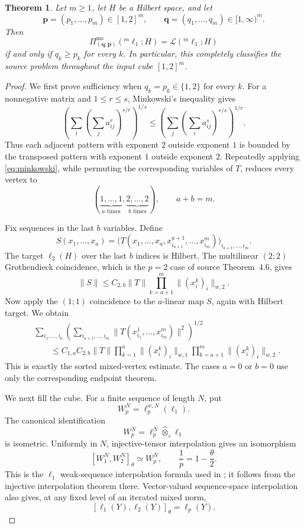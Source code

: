 \documentclass[11pt]{article}
\newtheorem{theorem}{Theorem}
\newcommand{\Lcal}{\mathcal L}
\begin{document}
\begin{theorem}\label{thm:main}
Let \(m\ge1\), let \(H\) be a Hilbert space, and let
\[
 \mathbf p=(p_1,\ldots,p_m)\in[1,2]^m,
 \qquad \mathbf q=(q_1,\ldots,q_m)\in[1,\infty)^m.
\]
Then
\[
 \Pi^{\mathrm{ms}}_{(\mathbf q;\mathbf p)}({}^m\ell_1;H)
 =\Lcal({}^m\ell_1;H)
\]
if and only if \(q_k\ge p_k\) for every \(k\).
In particular, this completely classifies the source problem throughout
the input cube \([1,2]^m\).
\end{theorem}

\begin{proof}
We first prove sufficiency when \(q_k=p_k\in\{1,2\}\) for every \(k\).
For a nonnegative matrix and \(1\le r\le s\), Minkowski's inequality gives
\begin{equation}\label{eq:minkowski}
 \left(\sum_i\left(\sum_j a_{ij}^{r}\right)^{s/r}\right)^{1/s}
 \le
 \left(\sum_j\left(\sum_i a_{ij}^{s}\right)^{r/s}\right)^{1/r}.
\end{equation}
Thus each adjacent pattern with exponent \(2\) outside exponent \(1\) is
bounded by the transposed pattern with exponent \(1\) outside exponent
\(2\).  Repeatedly applying \eqref{eq:minkowski}, while permuting the
corresponding variables of \(T\), reduces every vertex to
\[
 (\underbrace{1,\ldots,1}_{a\text{ times}},
  \underbrace{2,\ldots,2}_{b\text{ times}}),\qquad a+b=m.
\]

Fix sequences in the last \(b\) variables.  Define
\[
 S(x_1,\ldots,x_a)
 =\big(T(x_1,\ldots,x_a,x^{a+1}_{i_{a+1}},\ldots,
 x^m_{i_m})\big)_{i_{a+1},\ldots,i_m}.
\]
The target \(\ell_2(H)\) over the last \(b\) indices is Hilbert.  The
multilinear \((2;2)\) Grothendieck coincidence, which is the \(p=2\)
case of source Theorem~4.6, gives
\[
 \|S\|\le C_{2,b}\|T\|
 \prod_{k=a+1}^m\|(x_i^k)_i\|_{w,2}.
\]
Now apply the \((1;1)\) coincidence to the \(a\)-linear map \(S\), again
with Hilbert target.  We obtain
\begin{align*}
 &\sum_{i_1,\ldots,i_a}
 \left(\sum_{i_{a+1},\ldots,i_m}
 \|T(x^1_{i_1},\ldots,x^m_{i_m})\|^2\right)^{1/2}\\
 &\qquad\le C_{1,a}C_{2,b}\|T\|
 \prod_{k=1}^{a}\|(x_i^k)_i\|_{w,1}
 \prod_{k=a+1}^{m}\|(x_i^k)_i\|_{w,2}.
\end{align*}
This is exactly the sorted mixed-vertex estimate.  The cases \(a=0\) or
\(b=0\) use only the corresponding endpoint theorem.

We next fill the cube.  For a finite sequence of length \(N\), put
\[
 W_p^N=\ell_p^{w,N}(\ell_1).
\]
The canonical identification
\[
 W_p^N=\ell_p^N\widehat\otimes_\varepsilon\ell_1
\]
is isometric.  Uniformly in \(N\), injective-tensor interpolation gives an
isomorphism
\begin{equation}\label{eq:weak-interp}
 [W_1^N,W_2^N]_\theta\simeq W_p^N,
 \qquad \frac1p=1-\frac\theta2.
\end{equation}
This is the \(\ell_1\) weak-sequence interpolation formula used in
\cite[Section~2]{bpr}; it follows from the injective interpolation theorem
there.  Vector-valued sequence-space interpolation also gives, at any fixed
level of an iterated mixed norm,
\[
 [\ell_1(Y),\ell_2(Y)]_\theta=\ell_p(Y).
\]


\end{proof}
\end{document}
